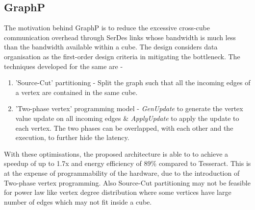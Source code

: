  \subsection{GraphP} The motivation behind GraphP \cite{GraphP} is to reduce the excessive cross-cube communication overhead through SerDes links whose bandwidth is much less than the bandwidth available within a cube. The design considers data organisation as the first-order design criteria in mitigating the bottleneck. The techniques developed for the same are -
 \begin{enumerate}
  \item 'Source-Cut' partitioning - Split the graph such that all the incoming edges of a vertex are contained in the same cube.
  \item 'Two-phase vertex' programming model - \textit{GenUpdate} to generate the vertex value update on all incoming edges \& \textit{ApplyUpdate} to apply the update to each vertex. The two phases can be overlapped, with each other and the execution, to further hide the latency.
 \end{enumerate}
  With these optimisations, the proposed architecture is able to to achieve a speedup of up to 1.7x and energy efficiency of 89\% compared to Tesseract. This is at the expense of programmability of the hardware, due to the introduction of Two-phase vertex programming. Also Source-Cut partitioning may not be feasible for power law like vertex degree distribution where some vertices have large number of edges which may not fit inside a cube.
 